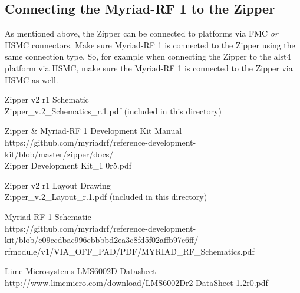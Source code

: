 \documentclass{article}
\begin{document}
\subsection*{Connecting the Myriad-RF 1 to the Zipper}
As mentioned above, the Zipper can be connected to platforms via FMC \textit{or} HSMC connectors. Make sure Myriad-RF 1 is connected to the Zipper using the same connection type. So, for example when connecting the Zipper to the alst4 platform via HSMC, make sure the Myriad-RF 1 is connected to the Zipper via HSMC as well.
\pagebreak
  \begin{thebibliography}{1}

   Zipper v2 r1 Schematic\\
	 Zipper\_v.2\_Schematics\_r.1.pdf (included in this directory)

   Zipper \& Myriad-RF 1 Development Kit Manual\\ https://github.com/myriadrf/reference-development-kit/blob/master/zipper/docs/\\Zipper Development Kit\_1 0r5.pdf

   Zipper v2 r1 Layout Drawing\\
	 Zipper\_v.2\_Layout\_r.1.pdf (included in this directory)

   Myriad-RF 1 Schematic\\ https://github.com/myriadrf/reference-development-kit/blob/c09ccdbac996ebbbbd2ea3c8fd5f02affb97e6ff/\\rfmodule/v1/VIA\_OFF\_PAD/PDF/MYRIAD\_RF\_Schematics.pdf

   Lime Microsystems LMS6002D Datasheet\\
	 http://www.limemicro.com/download/LMS6002Dr2-DataSheet-1.2r0.pdf

  \end{thebibliography}
\end{document}
